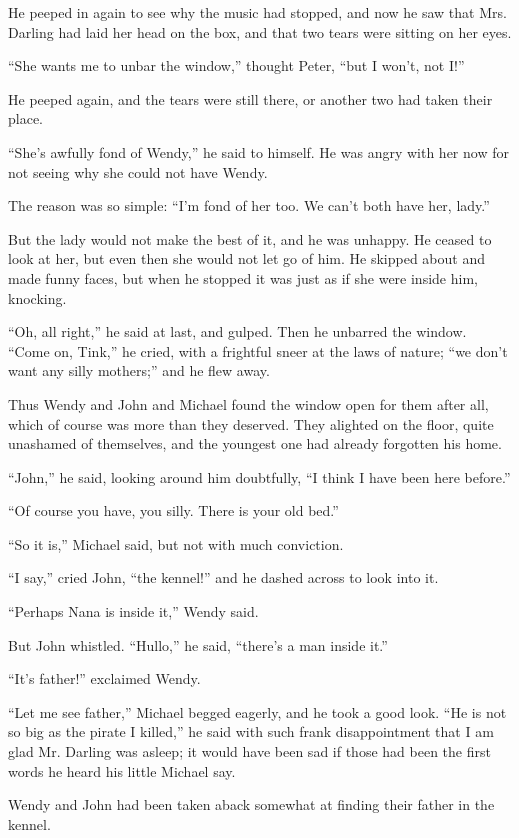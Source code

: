 He peeped in again to see why the music had stopped, and now he saw
that Mrs. Darling had laid her head on the box, and that two tears were
sitting on her eyes.

``She wants me to unbar the window,'' thought Peter, ``but I won't, not
I!''

He peeped again, and the tears were still there, or another two had
taken their place.

``She's awfully fond of Wendy,'' he said to himself. He was angry with
her now for not seeing why she could not have Wendy.

The reason was so simple: ``I'm fond of her too. We can't both have her,
lady.''

But the lady would not make the best of it, and he was unhappy. He
ceased to look at her, but even then she would not let go of him. He
skipped about and made funny faces, but when he stopped it was just as
if she were inside him, knocking.

``Oh, all right,'' he said at last, and gulped. Then he unbarred the
window. ``Come on, Tink,'' he cried, with a frightful sneer at the laws
of nature; ``we don't want any silly mothers;'' and he flew away.

Thus Wendy and John and Michael found the window open for them after
all, which of course was more than they deserved. They alighted on the
floor, quite unashamed of themselves, and the youngest one had already
forgotten his home.

``John,'' he said, looking around him doubtfully, ``I think I have been
here before.''

``Of course you have, you silly. There is your old bed.''

``So it is,'' Michael said, but not with much conviction.

``I say,'' cried John, ``the kennel!'' and he dashed across to look into
it.

``Perhaps Nana is inside it,'' Wendy said.

But John whistled. ``Hullo,'' he said, ``there's a man inside it.''

``It's father!'' exclaimed Wendy.

``Let me see father,'' Michael begged eagerly, and he took a good look.
``He is not so big as the pirate I killed,'' he said with such frank
disappointment that I am glad Mr. Darling was asleep; it would have
been sad if those had been the first words he heard his little Michael
say.

Wendy and John had been taken aback somewhat at finding their father in
the kennel.

